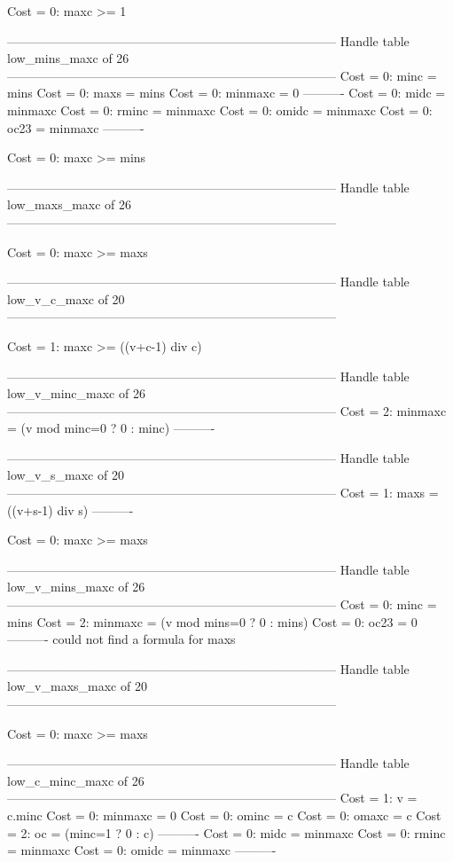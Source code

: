 Cost =  0:  maxc >= 1

--------------------------------------------------------------------------------
Handle table low_mins_maxc of 26
--------------------------------------------------------------------------------
Cost =  0:  minc    = mins
Cost =  0:  maxs    = mins
Cost =  0:  minmaxc = 0
----------
Cost =  0:  midc    = minmaxc
Cost =  0:  rminc   = minmaxc
Cost =  0:  omidc   = minmaxc
Cost =  0:  oc23    = minmaxc
----------

Cost =  0:  maxc >= mins

--------------------------------------------------------------------------------
Handle table low_maxs_maxc of 26
--------------------------------------------------------------------------------

Cost =  0:  maxc >= maxs

--------------------------------------------------------------------------------
Handle table low_v_c_maxc of 20
--------------------------------------------------------------------------------

Cost =  1:  maxc >= ((v+c-1) div c)

--------------------------------------------------------------------------------
Handle table low_v_minc_maxc of 26
--------------------------------------------------------------------------------
Cost =  2:  minmaxc = (v mod minc=0 ? 0 : minc)
----------


--------------------------------------------------------------------------------
Handle table low_v_s_maxc of 20
--------------------------------------------------------------------------------
Cost =  1:  maxs = ((v+s-1) div s)
----------

Cost =  0:  maxc >= maxs

--------------------------------------------------------------------------------
Handle table low_v_mins_maxc of 26
--------------------------------------------------------------------------------
Cost =  0:  minc    = mins
Cost =  2:  minmaxc = (v mod mins=0 ? 0 : mins)
Cost =  0:  oc23    = 0
----------
could not find a formula for maxs


--------------------------------------------------------------------------------
Handle table low_v_maxs_maxc of 20
--------------------------------------------------------------------------------

Cost =  0:  maxc >= maxs

--------------------------------------------------------------------------------
Handle table low_c_minc_maxc of 26
--------------------------------------------------------------------------------
Cost =  1:  v       = c.minc
Cost =  0:  minmaxc = 0
Cost =  0:  ominc   = c
Cost =  0:  omaxc   = c
Cost =  2:  oc      = (minc=1 ? 0 : c)
----------
Cost =  0:  midc    = minmaxc
Cost =  0:  rminc   = minmaxc
Cost =  0:  omidc   = minmaxc
----------

